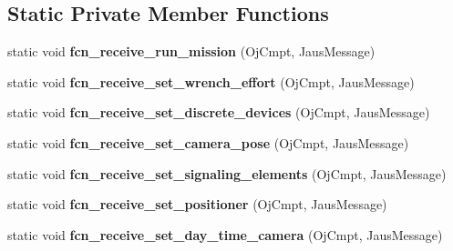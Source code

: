 \subsection*{\-Static \-Private \-Member \-Functions}
\begin{DoxyCompactItemize}
\item 
\hypertarget{class_ros_node___communications_ad470be9b485d6a244a6f26ed9fefc108}{static void {\bfseries fcn\-\_\-receive\-\_\-run\-\_\-mission} (\-Oj\-Cmpt, \-Jaus\-Message)}\label{class_ros_node___communications_ad470be9b485d6a244a6f26ed9fefc108}

\item 
\hypertarget{class_ros_node___communications_a53a99b63d008e6a893ac43a4230f5534}{static void {\bfseries fcn\-\_\-receive\-\_\-set\-\_\-wrench\-\_\-effort} (\-Oj\-Cmpt, \-Jaus\-Message)}\label{class_ros_node___communications_a53a99b63d008e6a893ac43a4230f5534}

\item 
\hypertarget{class_ros_node___communications_ab1cd91d196005ce289913c55cc83f88a}{static void {\bfseries fcn\-\_\-receive\-\_\-set\-\_\-discrete\-\_\-devices} (\-Oj\-Cmpt, \-Jaus\-Message)}\label{class_ros_node___communications_ab1cd91d196005ce289913c55cc83f88a}

\item 
\hypertarget{class_ros_node___communications_af7b214d4cc34f9da22d43e1ba0174227}{static void {\bfseries fcn\-\_\-receive\-\_\-set\-\_\-camera\-\_\-pose} (\-Oj\-Cmpt, \-Jaus\-Message)}\label{class_ros_node___communications_af7b214d4cc34f9da22d43e1ba0174227}

\item 
\hypertarget{class_ros_node___communications_a9fb8ced9ca410808be65ade658e98655}{static void {\bfseries fcn\-\_\-receive\-\_\-set\-\_\-signaling\-\_\-elements} (\-Oj\-Cmpt, \-Jaus\-Message)}\label{class_ros_node___communications_a9fb8ced9ca410808be65ade658e98655}

\item 
\hypertarget{class_ros_node___communications_af66d217958756fb503ae80f7cd63396f}{static void {\bfseries fcn\-\_\-receive\-\_\-set\-\_\-positioner} (\-Oj\-Cmpt, \-Jaus\-Message)}\label{class_ros_node___communications_af66d217958756fb503ae80f7cd63396f}

\item 
\hypertarget{class_ros_node___communications_ad1c8f9fa03d460ec1d94208029406558}{static void {\bfseries fcn\-\_\-receive\-\_\-set\-\_\-day\-\_\-time\-\_\-camera} (\-Oj\-Cmpt, \-Jaus\-Message)}\label{class_ros_node___communications_ad1c8f9fa03d460ec1d94208029406558}


\end{DoxyCompactItemize}
